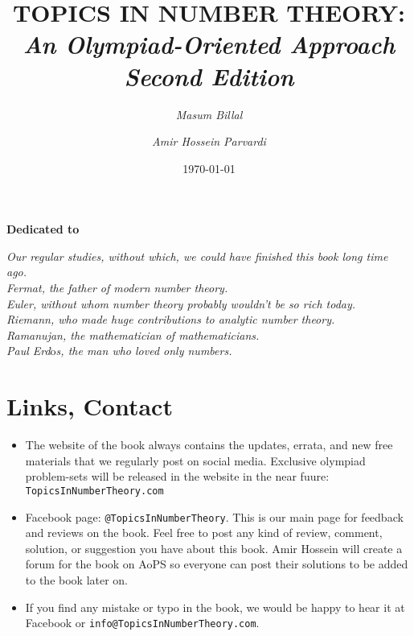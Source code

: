 \documentclass[12pt]{book}
\title{\bf TOPICS IN NUMBER THEORY:\\ \it An Olympiad-Oriented Approach\\Second Edition}
\author{
	\it Masum Billal%
	\and
	\it Amir Hossein Parvardi%
}
\date{\today}
\begin{document}
\frontmatter
\maketitle
\pagestyle{plain}

\begin{dedication}
	\begin{center}
		\textbf{Dedicated to}
	\end{center}\slshape
	Our regular studies, without which, we could have finished this book long time ago.\\
	Fermat, the father of modern number theory.\\
	Euler, without whom number theory probably wouldn't be so rich today.\\
	Riemann, who made huge contributions to analytic number theory.\\
	Ramanujan, the mathematician of mathematicians.\\
	Paul Erd$\ddot{\mbox{o}}$s, the man who loved only numbers.
\end{dedication}

\section*{Links, Contact}

\begin{itemize}
	\item The website of the book always contains the updates, errata, and new free materials that we regularly post on social media. Exclusive olympiad problem-sets will be released in the website in the near fuure: \texttt{TopicsInNumberTheory.com}
	\item Facebook page: \texttt{@TopicsInNumberTheory}. This is our main page for feedback and reviews on the book. Feel free to post any kind of review, comment, solution, or suggestion you have about this book. Amir Hossein will create a forum for the book on AoPS so everyone can post their solutions to be added to the book later on.
	\item If you find any mistake or typo in the book, we would be happy to hear it at Facebook or \texttt{info@TopicsInNumberTheory.com}.
\end{itemize}
\end{document}
